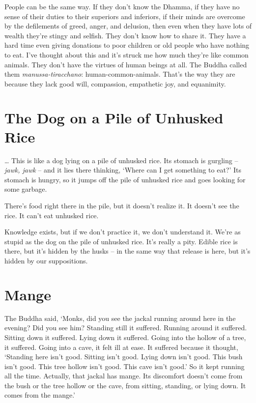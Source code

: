 People can be the same way. If they don't know the Dhamma, if they have no sense of their duties to their superiors and inferiors, if their minds are overcome by the defilements of greed, anger, and delusion, then even when they have lots of wealth they're stingy and selfish. They don't know how to share it. They have a hard time even giving donations to poor children or old people who have nothing to eat. I've thought about this and it's struck me how much they're like common animals. They don't have the virtues of human beings at all. The Buddha called them \textit{manussa-tiracchano}: human-common-animals. That's the way they are because they lack good will, compassion, empathetic joy, and equanimity.

\clearpage

\section{The Dog on a Pile of Unhusked Rice}

\ldots{} This is like a dog lying on a pile of unhusked rice. Its stomach is gurgling -- \textit{jawk, jawk} -- and it lies there thinking, `Where can I get something to eat?' Its stomach is hungry, so it jumps off the pile of unhusked rice and goes looking for some garbage. 

There's food right there in the pile, but it doesn't realize it. It doesn't see the rice. It can't eat unhusked rice.

Knowledge exists, but if we don't practice it, we don't understand it. We're as stupid as the dog on the pile of unhusked rice. It's really a pity. Edible rice is there, but it's hidden by the husks -- in the same way that release is here, but it's hidden by our suppositions.

\clearpage

\section{Mange}

\enlargethispage{\baselineskip}
The Buddha said, `Monks, did you see the jackal running around here in the evening? Did you see him? Standing still it suffered. Running around it suffered. Sitting down it suffered. Lying down it suffered. Going into the hollow of a tree, it suffered. Going into a cave, it felt ill at ease. It suffered because it thought, `Standing here isn't good. Sitting isn't good. Lying down isn't good. This bush isn't good. This tree hollow isn't good. This cave isn't good.' So it kept running all the time. Actually, that jackal has mange. Its discomfort doesn't come from the bush or the tree hollow or the cave, from sitting, standing, or lying down. It comes from the mange.'

